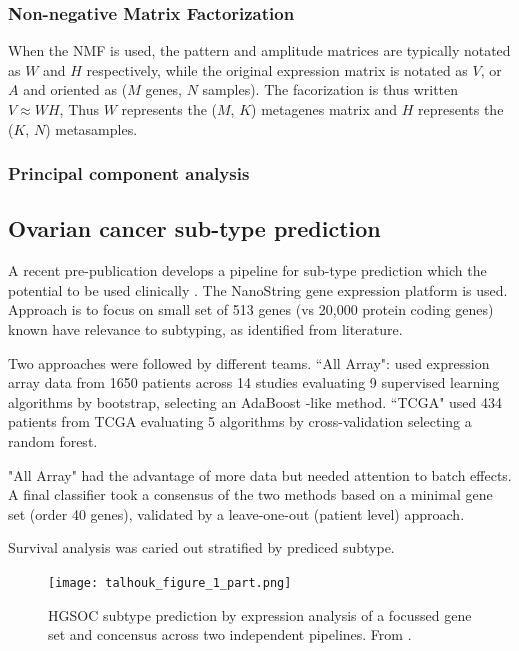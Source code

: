 \documentclass[tikz, 12pt,a4paper,oneside,fleqn]{article}
\begin{document}
\subsubsection{Non-negative Matrix Factorization}

When the NMF is used, the pattern and amplitude matrices are typically notated as $W$ and $H$ respectively, while the original expression matrix is notated as $V$, or $A$ and oriented as ($M$ genes, $N$ samples).   The facorization is thus written $V \approx W H$, Thus $W$ represents the ($M$, $K$) metagenes matrix and $H$ represents the ($K$, $N$) metasamples.

\subsubsection{Principal component analysis}

\subsection{Ovarian cancer sub-type prediction}

A recent pre-publication develops a pipeline for sub-type prediction which the potential to be used clinically \cite{Talhouk2020}.
The NanoString gene expression platform is used. Approach is to focus on small set of 513 genes (vs 20,000 protein coding genes) known have relevance to subtyping, as identified from literature.

Two approaches were followed by different teams.  ``All Array": used expression array data from 1650 patients across 14 studies evaluating 9 supervised learning algorithms by bootstrap, selecting an AdaBoost -like method. ``TCGA" used 434 patients from TCGA evaluating 5 algorithms by cross-validation selecting a random forest.

"All Array" had the advantage of more data but needed attention to batch effects. A final classifier took a consensus of the two methods based on a minimal gene set (order 40 genes), validated by a leave-one-out (patient level) approach.

Survival analysis was caried out stratified by prediced subtype.


\begin{figure}
\begin{center}
\texttt{[image: talhouk\_figure\_1\_part.png]}
\end{center}
\caption{HGSOC subtype prediction by expression analysis of a focussed gene set and concensus across two independent pipelines.  From \cite{Talhouk2020}.}
\label{fig-talhouk_figure_1_part.png}
\end{figure}
\end{document}
